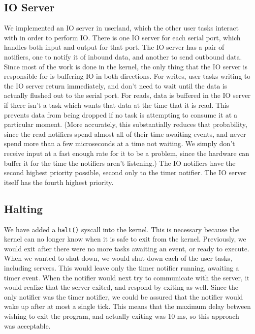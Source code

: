 \documentclass[titlepage]{article}
\begin{document}
\subsection{IO Server}
We implemented an IO server in userland, which the other user tasks interact with
in order to perform IO.\@
There is one IO server for each serial port, which handles both input and output
for that port.
The IO server has a pair of notifiers, one to notify it of inbound data, and another
to send outbound data.
Since most of the work is done in the kernel, the only thing that the IO server
is responsible for is buffering IO in both directions.
For writes, user tasks writing to the IO server return immediately, and don't need
to wait until the data is actually flushed out to the serial port.
For reads, data is buffered in the IO server if there isn't a task which wants
that data at the time that it is read.
This prevents data from being dropped if no task is attempting to consume it at a particular moment.
(More accurately, this substantially reduces that probability, since the read notifiers
spend almost all of their time awaiting events, and never spend more than a few microseconds
at a time not waiting. We simply don't receive input at a fast enough rate for it to be a problem, since
the hardware can buffer it for the time the notifiers aren't listening.)
The IO notifiers have the second highest priority possible, second only to the timer notifier.
The IO server itself has the fourth highest priority.

\subsection{Halting}
We have added a \texttt{halt()} syscall into the kernel.
This is necessary because the kernel can no longer know when it is safe to exit from the kernel.
Previously, we would exit after there were no more tasks awaiting an event, or ready to execute.
When we wanted to shut down, we would shut down each of the user tasks, including servers.
This would leave only the timer notifier running, awaiting a timer event.
When the notifier would next try to communicate with the server, it would realize
that the server exited, and respond by exiting as well.
Since the only notifier was the timer notifier, we could be assured that the notifier
would wake up after at most a single tick.
This means that the maximum delay between wishing to exit the program, and actually
exiting was 10 ms, so this approach was acceptable.
\end{document}
